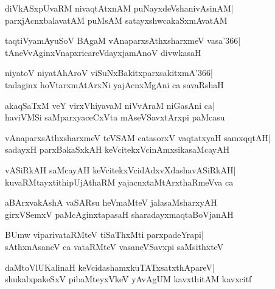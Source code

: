 \documentclass[twoside,12pt,openright]{book}
\newcounter{shloka}[chapter]
\begin{document}
\begin{shloka}%
diVkASxpUvaRM nivaqtAtxnAM puNayxdeVshanivAsinAM|\\
parxjAcnxbalavatAM puMsAM satayxshwcakaSxmAvatAM
\end{shloka}

\begin{shloka}%
taqtiVyamAyuSoV BAgaM vAnaparxsAthxsharxmeV vasa\char'366|\\
tAneVvAginxVnapxricareVdayxjamAnoV divwkasaH
\end{shloka}

\begin{shloka}%
niyatoV niyatAhAroV viSuNxBakitxparxsakitxmA\char'366|\\
tadaginx hoVtarxmAtArxNi yajAcnxMgAni ca savaRshaH
\end{shloka}

\begin{shloka}%
akaqSaTxM veY virxVhiyavaM niVvAraM niGasAni ca|\\
haviVMSi saMparxyaceCxVta mAseVSavxtArxpi paMcasu
\end{shloka}

\begin{shloka}%
vAnaparxsAthxsharxmeV teVSAM catasorxV vaqtatxyaH samxqqtAH|\\
sadayxH parxBakaSxkAH keVcitekxVcinAmxsikasaMcayAH
\end{shloka}

\begin{shloka}%
vASiRkAH saMcayAH keVcitekxVcidAdxvXdashavASiRkAH|\\
kuvaRMtayxtithipUjAthaRM yajacnxtaMtArxthaRmeVva ca 
\end{shloka}

\begin{shloka}%
aBArxvakAshA vaSARsu heVmaMteV jalasaMsharxyAH\\
girxVSemxV paMcAginxtapasaH sharadayxmaqtaBoVjanAH
\end{shloka}

\begin{shloka}%
BUmw viparivataRMteV tiSaThxMti parxpadeYrapi|\\
sAthxnAsaneV ca vataRMteV vasaneVSavxpi saMsithxteV
\end{shloka}

\begin{shloka}%
daMtoVlUKalinaH keVcidashamxkuTATxsatxthApareV|\\
shukalxpakeSxV pibaMteyxVkeV yAvAgUM kavxthitAM kavxcitf
\end{shloka}
\end{document}
